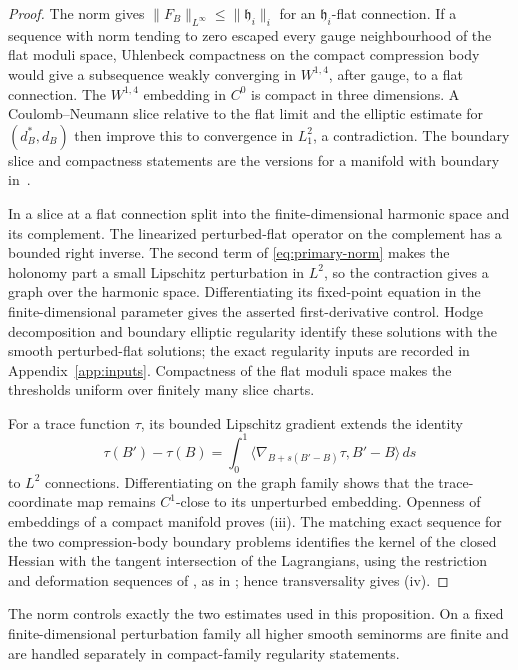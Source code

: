 \documentclass[11pt]{amsart}
\theoremstyle{definition}
\theoremstyle{remark}
\theoremstyle{plain}
\numberwithin{equation}{section}
\begin{document}
\begin{proof}
The norm gives
$\|F_B\|_{L^\infty}\le\|\mathfrak h_i\|_i$ for an
$\mathfrak h_i$-flat connection. If a sequence with norm
tending to zero escaped every gauge neighbourhood
of the flat moduli space, Uhlenbeck compactness
on the compact compression body would give a
subsequence weakly converging in $W^{1,4}$,
after gauge, to a flat connection. The
$W^{1,4}$ embedding in $C^0$ is compact in
three dimensions. A Coulomb--Neumann slice
relative to the flat limit and the elliptic
estimate for $(d_B^*,d_B)$ then improve this
to convergence in $L^2_1$, a contradiction.
The boundary slice and compactness statements
are the versions for a manifold with boundary
in~\cite{Wehrheim-book}.

In a slice at a flat connection split into the
finite-dimensional harmonic space and its
complement. The linearized perturbed-flat
operator on the complement has a bounded
right inverse. The second term of
\eqref{eq:primary-norm} makes the holonomy
part a small Lipschitz perturbation in
$L^2$, so the contraction gives a graph over
the harmonic space. Differentiating its
fixed-point equation in the finite-dimensional
parameter gives the asserted first-derivative
control. Hodge decomposition and boundary
elliptic regularity identify these solutions
with the smooth perturbed-flat solutions;
the exact regularity inputs are recorded in
Appendix~\ref{app:inputs}. Compactness of the
flat moduli space makes the thresholds
uniform over finitely many slice charts.

For a trace function $\tau$, its bounded
Lipschitz gradient extends the identity
\[
 \tau(B')-\tau(B)=\int_0^1
 \langle\nabla_{B+s(B'-B)}\tau,B'-B\rangle\,ds
\]
to $L^2$ connections. Differentiating on the
graph family shows that the trace-coordinate
map remains $C^1$-close to its unperturbed
embedding. Openness of embeddings of a
compact manifold proves (iii). The matching
exact sequence for the two compression-body
boundary problems identifies the kernel
of the closed Hessian with the tangent
intersection of the Lagrangians, using the
restriction and deformation sequences of
\cite[Propositions~2.10 and~2.16]{DFL}, as in \cite[Lemmas~2.45 and~2.47]{DFL}; hence
transversality gives (iv).
\end{proof}

The norm controls exactly the two estimates
used in this proposition. On a fixed
finite-dimensional perturbation family all
higher smooth seminorms are finite and are
handled separately in compact-family
regularity statements.
\end{document}
